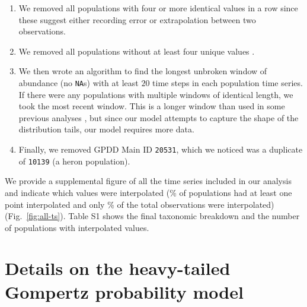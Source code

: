 \begin{enumerate}
\item We removed all populations with four or more identical values in a row
  since these suggest either recording error or extrapolation between two
  observations.

\item We removed all populations without at least four unique values
  \citep[following][]{brook2006a}.

\item We then wrote an algorithm to find the longest unbroken window of
  abundance (no \texttt{NA}s) with at least $20$ time steps in each population
  time series. If there were any populations with multiple windows of identical
  length, we took the most recent window. This is a longer window than used in
  some previous analyses \citep[e.g.][]{brook2006a}, but since our model
  attempts to capture the shape of the distribution tails, our model requires
  more data.

\item Finally, we removed GPDD Main ID \texttt{20531}, which we noticed was
  a duplicate of \texttt{10139} (a heron population).

\end{enumerate}

\noindent
We provide a supplemental figure of all the time series included in our analysis
and indicate which values were interpolated (\percImputedPops\% of populations
had at least one point interpolated and only \percImputedPoints\% of the total
observations were interpolated) (Fig.~\ref{fig:all-ts}). Table S1 shows the
final taxonomic breakdown and the number of populations with interpolated
values.

\section{Details on the heavy-tailed Gompertz probability model}


